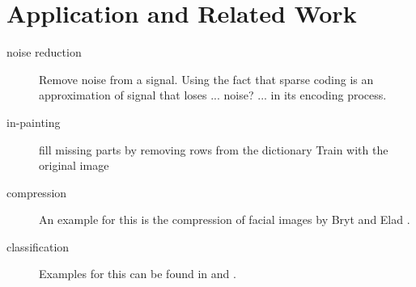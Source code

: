 \section{Application and Related Work}

\begin{description}
\item[noise reduction]
Remove noise from a signal. 
Using the fact that sparse coding is an approximation of signal that loses ... noise? ... in its encoding process. 

\cite{Elad2006}

\item[in-painting]
fill missing parts by removing rows from the dictionary
Train with the original image
\cite{mairal08sparse}

\item[compression] An example for this is the compression of facial images by Bryt and Elad \cite{Bryt2008}.
\item[classification] Examples for this can be found in \cite{Mairal2008b} and \cite{Bar2009}.


\end{description}





